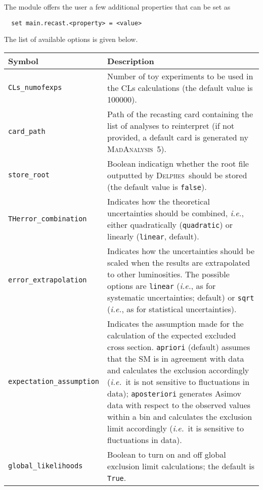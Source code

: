 \documentclass[a4paper]{article}
\newcommand{\MA}{\textsc{MadAnalysis}~5}
\newcommand{\DEL}{\textsc{Delphes}}
\newcommand{\ie}{\textit{i.e.}}
\begin{document}
\noindent The module offers the user a few additional properties that can be set
as
{\color{ao} \begin{verbatim}
  set main.recast.<property> = <value>
\end{verbatim}}
The list of available options is given below.
\renewcommand{\arraystretch}{1.2}%
\begin{center}\begin{tabular}{l p{8.4cm}}
\hline
  Symbol& Description\\
  \hline
  \color{ao} \verb?CLs_numofexps? & Number of toy experiments to be used in the
    CLs calculations (the default value is 100000). \\
  \color{ao} \verb?card_path?     & Path of the recasting card containing the
    list of analyses to reinterpret (if not provided, a default card is
    generated ny \MA).\\
  \color{ao} \verb?store_root?    & Boolean indicatign whether the root file
    outputted by \DEL\ should be stored (the default value is \verb|false|).\\
  \color{ao} \verb?THerror_combination? & Indicates how the theoretical
    uncertainties should be combined, \ie, either quadratically
    (\verb|quadratic|) or linearly (\verb|linear|, default).\\
  \color{ao} \verb?error_extrapolation? & Indicates how the uncertainties should
    be scaled when the results are extrapolated to other luminosities. The
    possible options are \verb|linear| (\ie, as for systematic uncertainties;
    default) or \verb|sqrt| (\ie, as for statistical uncertainties).\\
  \color{ao} \verb?expectation_assumption? & Indicates the assumption made for the calculation of the expected excluded cross section. \texttt{apriori} (default) assumes that the SM is in agreement with data and calculates the exclusion accordingly ({\it i.e.}\ it is not sensitive to fluctuations in data); \texttt{aposteriori} generates Asimov data with respect to the observed values within a bin and calculates the exclusion limit accordingly ({\it i.e.}\ it is sensitive to fluctuations in data).\\
  \color{ao} \verb?global_likelihoods? & Boolean to turn on and off global exclusion limit calculations; the default is \texttt{True}.\\
\hline
\end{tabular}
\end{center}




\newpage
 

\end{document}
